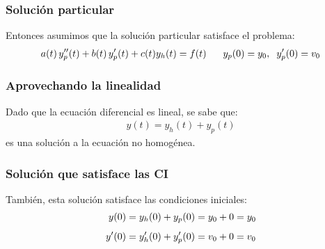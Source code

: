 \documentclass[12pt]{beamer}
\begin{document}
\begin{frame}
\frametitle{Solución particular}
Entonces asumimos que la solución particular satisface el problema:
\pause
\begin{align}
a (t) \, {y}^{\prime \prime}_{p} (t) + b (t) \, {y}^{\prime}_{p} (t) + c (t) y_{h} (t) = f (t) \hspace{0.6cm} y_{p} (0) = y_{0}, \hspace{0.2cm} {y}^{\prime}_{p} (0) = v_{0}
\label{eq:ecuacion_07_14}
\end{align}
\end{frame}

\begin{frame}
\frametitle{Aprovechando la linealidad}
Dado que la ecuación diferencial es lineal, se sabe que:
\pause
\begin{align*}
y (t) = y_{h} (t) + y_{p} (t)
\end{align*}
es una solución a la ecuación no homogénea.
\end{frame}

\begin{frame}
\frametitle{Solución que satisface las CI}
También, esta solución satisface las condiciones iniciales:
\pause
\begin{align*}
y (0) &= y_{h} (0) + y_{p} (0) = y_{0} + 0 = y_{0} \\[0.5em]
{y}^{\prime} (0) &= {y}^{\prime}_{h} (0) + {y}^{\prime}_{p} (0) = v_{0} + 0 = v_{0}
\end{align*}
\end{frame}
\end{document}
